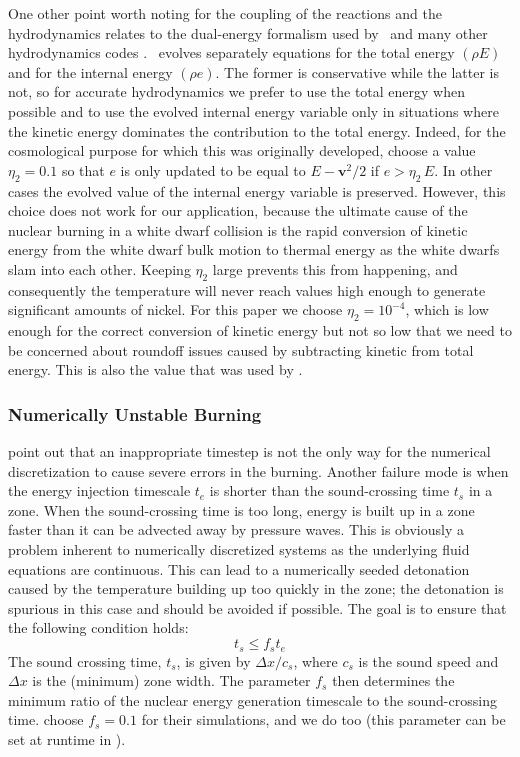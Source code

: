 \documentclass[12pt]{article}
\begin{document}
One other point worth noting for the coupling of the reactions
and the hydrodynamics relates to the dual-energy formalism used
by \castro\ and many other hydrodynamics codes \cite{bryan:1995}.
\castro\ evolves separately equations for the total energy $(\rho E)$ and
for the internal energy $(\rho e)$. The former is conservative while the latter
is not, so for accurate hydrodynamics we prefer to use the total
energy when possible and to use the evolved internal energy variable
only in situations where the kinetic energy dominates the contribution
to the total energy. Indeed, for the cosmological purpose for which
this was originally developed, \cite{ENZO} choose a value $\eta_2 = 0.1$
so that $e$ is only updated to be equal to $E - \mathbf{v}^2/2$ if
$e > \eta_2\, E$. In other cases the evolved value of the internal
energy variable is preserved. However, this choice does not work
for our application, because the ultimate cause of the nuclear
burning in a white dwarf collision is the rapid conversion of
kinetic energy from the white dwarf bulk motion to thermal energy
as the white dwarfs slam into each other. Keeping $\eta_2$ large
prevents this from happening, and consequently the temperature
will never reach values high enough to generate significant
amounts of nickel. For this paper we choose $\eta_2 = 10^{-4}$,
which is low enough for the correct conversion of kinetic energy
but not so low that we need to be concerned about roundoff issues
caused by subtracting kinetic from total energy. This is also
the value that was used by \cite{hawley:2012}.

\subsubsection{Numerically Unstable Burning}
\label{sec:unstable_burning}

\citet{kushnir:2013} point out that an inappropriate timestep is 
not the only way for the numerical discretization to cause 
severe errors in the burning. Another failure mode is when
the energy injection timescale
$t_e$ is shorter than the sound-crossing time $t_s$ in a zone.
When the sound-crossing time is too long, energy is built up in
a zone faster than it can be advected away by pressure waves.
This is obviously a problem inherent to numerically discretized
systems as the underlying fluid equations are continuous.
This can lead to a numerically seeded detonation caused by the
temperature building up too quickly in the zone; the detonation
is spurious in this case and should be avoided if possible.
The goal is to ensure that the following condition holds:
\begin{equation}
  t_s \leq f_{s} t_e \label{eq:burning_limiter_2}
\end{equation}
The sound crossing time, $t_s$, is given by $\Delta x / c_s$, 
where $c_s$ is the sound speed and $\Delta x$ is the (minimum) 
zone width. The parameter $f_{s}$ then determines the minimum
ratio of the nuclear energy generation timescale to the 
sound-crossing time. \citet{kushnir:2013} choose $f_{s} = 0.1$ 
for their simulations, and we do too (this parameter can be set 
at runtime in \castro).
\end{document}
